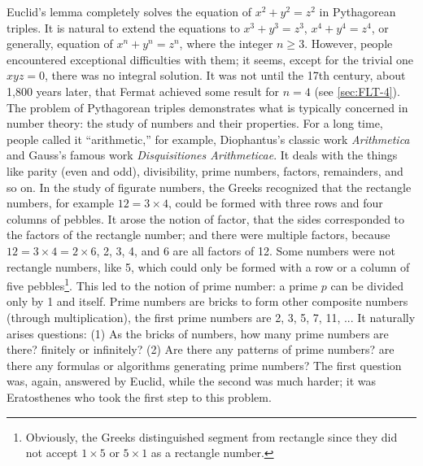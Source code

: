 \documentclass[b5paper]{article}
\begin{document}
Euclid's lemma completely solves the equation of $x^2 + y^2 = z^2$ in Pythagorean triples. It is natural to extend the equations to $x^3 + y^3 = z^3$, $x^4 + y^4 = z^4$, or generally, equation of $x^n + y^n = z^n$, where the integer $n \geq 3$. However, people encountered exceptional difficulties with them; it seems, except for the trivial one $xyz = 0$, there was no integral solution. It was not until the 17th century, about 1,800 years later, that Fermat achieved some result for $n = 4$ (see \cref{sec:FLT-4}). The problem of Pythagorean triples demonstrates what is typically concerned in number theory: the study of numbers and their properties. For a long time, people called it \enquote{arithmetic,} for example, Diophantus's classic work \emph{Arithmetica} and Gauss's famous work \emph{Disquisitiones Arithmeticae}. It deals with the things like parity (even and odd), divisibility, prime numbers, factors, remainders, and so on. In the study of figurate numbers, the Greeks recognized that the rectangle numbers, for example $12 = 3 \times 4$, could be formed with three rows and four columns of pebbles. It arose the notion of factor, that the sides corresponded to the factors of the rectangle number; and there were multiple factors, because $12 = 3 \times 4 = 2 \times 6$, 2, 3, 4, and 6 are all factors of 12. Some numbers were not rectangle numbers, like 5, which could only be formed with a row or a column of five pebbles\footnote{Obviously, the Greeks distinguished segment from rectangle since they did not accept $1 \times 5$ or $5 \times 1$ as a rectangle number.}. This led to the notion of prime number: a prime $p$ can be divided only by 1 and itself. Prime numbers are bricks to form other composite numbers (through multiplication), the first prime numbers are 2, 3, 5, 7, 11, ... It naturally arises questions: (1) As the bricks of numbers, how many prime numbers are there? finitely or infinitely? (2) Are there any patterns of prime numbers? are there any formulas or algorithms generating prime numbers? The first question was, again, answered by Euclid, while the second was much harder; it was Eratosthenes who took the first step to this problem.
\end{document}
